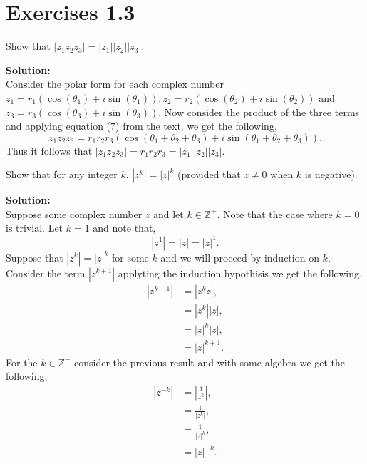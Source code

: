 \documentclass[12pt]{article}
\makeatletter
\theoremstyle{homework}
\newenvironment{exercise}[1]
{\def\@currentlabel{#1}\exercisecore}
{\endexercisecore}
\newcommand{\localhead}[1]{\par\smallskip\noindent\textbf{#1}\nobreak\\}%
\newcommand\solution{\localhead{Solution:}}
\makeatother
\begin{document}
\section*{Exercises 1.3}

\begin{exercise}{2} Show that $|z_1z_2z_3| = |z_1||z_2||z_3|$.\\
    \solution Consider the polar form for each complex number $z_1 = r_1( \cos(\theta_1) + i \sin(\theta_1)), z_2 = r_2( \cos(\theta_2) + i \sin(\theta_2))$ and $z_3 = r_3( \cos(\theta_3) + i \sin(\theta_3))$.
    Now consider the product of the three terms and applying equation (7) from the text, we get the following, 
    \begin{equation*}
        z_1z_2z_3 = r_1r_2r_3\left(\cos(\theta_1 + \theta_ 2 +\theta_3) + i \sin(\theta_1 + \theta_ 2 +\theta_3)\right).
    \end{equation*} 
    Thus it follows that $|z_1z_2z_3| = r_1r_2r_3 =  |z_1||z_2||z_3|$. 
\end{exercise}
\vspace{.15in}


\begin{exercise}{4} Show that for any integer $k$. $|z^k| = |z|^k$ (provided that $z \neq 0$ when $k$ is negative).\\
    \solution Suppose some complex number $z$ and let $k \in \mathbb{Z}^+$. Note that the case where $k = 0$ is trivial. Let $k = 1$ and note that, 
    \begin{equation*}
        |z^1| = |z| = |z|^1.
    \end{equation*}
    Suppose that $|z^k| = |z|^k$ for some $k$ and we will proceed by induction on $k$. Consider the term $|z^{k+1}|$ applyting the induction hypothisis we get the following, 
    \begin{align*}
        |z^{k + 1}| &= |z^{k}z|,\\
        &= |z^{k}||z|,\\ 
        &= |z|^{k}|z|,\\
        &= |z|^{k+1}.
    \end{align*}
    For the  $k \in \mathbb{Z}^-$ consider the previous result and with some algebra we get the following, 
    \begin{align*}
        |z^{-k}| &= |\frac{1}{z^k}|,\\
         &= \frac{1}{|z^k|},\\
         &= \frac{1}{|z|^k},\\
         &= |z|^{-k}.
    \end{align*}
\end{exercise}
\vspace{.15in}
\end{document}
